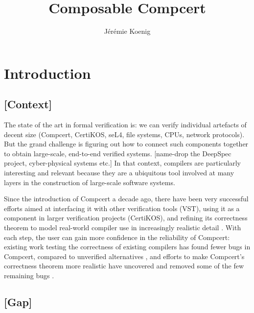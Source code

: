 \documentclass[sigplan,10pt,review,anonymous]{acmart}
\begin{document}
\title{%
  Composable Compcert%
}

\author{J\'er\'emie Koenig}

\begin{abstract} %
\end{abstract}

\maketitle

\section{Introduction} %

\subsection{[Context]}

The state of the art in formal verification is:
we can verify individual artefacts of decent size
(Compcert, CertiKOS, seL4, file systems, CPUs, network protocols).
But the grand challenge is figuring out
how to connect such components together
to obtain large-scale, end-to-end verified systems.
[name-drop the DeepSpec project, cyber-physical systems etc.]
In that context,
compilers are particularly interesting and relevant
because they are a ubiquitous tool
involved at many layers
in the construction of large-scale software systems.

Since the introduction of Compcert \cite{compcert} a decade ago,
there have been very successful efforts aimed at
interfacing it with other verification tools (VST),
using it as a component in larger verification projects (CertiKOS),
and refining its correctness theorem
to model real-world compiler use
in increasingly realistic detail
\citep{qompcert,sepcompcert,compcompcert,compcerttso,compcertshm}.
With each step,
the user can gain more confidence in the reliability of Compcert:
existing work testing the correctness of existing compilers
has found fewer bugs in Compcert,
compared to unverified alternatives \citep{csmith},
and efforts to make Compcert's correctness theorem more realistic
have uncovered and removed some of the few remaining bugs \citep{sepcompcert}.

\subsection{[Gap]}
\end{document}
